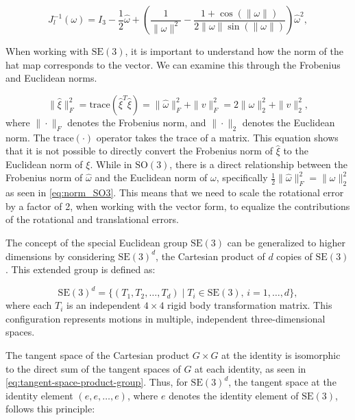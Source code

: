 \begin{equation}
    J_l^{-1}(\omega) = I_3 - \frac{1}{2} \hat{\omega} + \left(\frac{1}{\|\omega\|^2} - \frac{1 + \cos(\|\omega\|)}{2 \|\omega\| \sin(\|\omega\|)}\right) \hat{\omega}^2,
    \label{eq:left_Jacobian_inverse}
\end{equation}

When working with \(\mathrm{SE}(3)\), it is important to understand how the norm of the hat map corresponds to the vector. We can examine this through the Frobenius and Euclidean norms.

\begin{equation}
    \|\hat{\xi}\|_F^2 
    = \text{trace}(\hat{\xi}^T \hat{\xi}) 
    = \|\hat{\omega}\|_F^2 + \|v\|_F^2 
    = 2\|\omega\|_2^2 + \|v\|_2^2,
    \label{eq:norm_SE3}
\end{equation}
where \(\|\cdot\|_F\) denotes the Frobenius norm, and \(\|\cdot\|_2\) denotes the Euclidean norm. The \(\text{trace}(\cdot)\) operator takes the trace of a matrix. This equation shows that it is not possible to directly convert the Frobenius norm of \(\hat{\xi}\) to the Euclidean norm of \(\xi\). While in \(\mathrm{SO}(3)\), there is a direct relationship between the Frobenius norm of \(\hat{\omega}\) and the Euclidean norm of \(\omega\), specifically \(\frac{1}{2}\|\hat{\omega}\|_F^2 = \|\omega\|_2^2\) as seen in \eqref{eq:norm_SO3}. This means that we need to scale the rotational error by a factor of 2, when working with the vector form, to equalize the contributions of the rotational and translational errors.


The concept of the special Euclidean group \(\mathrm{SE}(3)\) can be generalized to higher dimensions by considering \(\mathrm{SE}(3)^d\), the Cartesian product of \(d\) copies of \(\mathrm{SE}(3)\). This extended group is defined as:

\begin{equation}
    \mathrm{SE}(3)^d = \{ (T_1, T_2, \dots, T_d) \mid T_i \in \mathrm{SE}(3), \, i = 1, \dots, d \},
\end{equation}
where each \( T_i \) is an independent \( 4 \times 4 \) rigid body transformation matrix. This configuration represents motions in multiple, independent three-dimensional spaces.

The tangent space of the Cartesian product \(G \times G\) at the identity is isomorphic to the direct sum of the tangent spaces of \(G\) at each identity, as seen in \eqref{eq:tangent-space-product-group}. Thus, for \(\mathrm{SE}(3)^d\), the tangent space at the identity element \((e, e, \dots, e)\), where \( e \) denotes the identity element of \(\mathrm{SE}(3)\), follows this principle:

